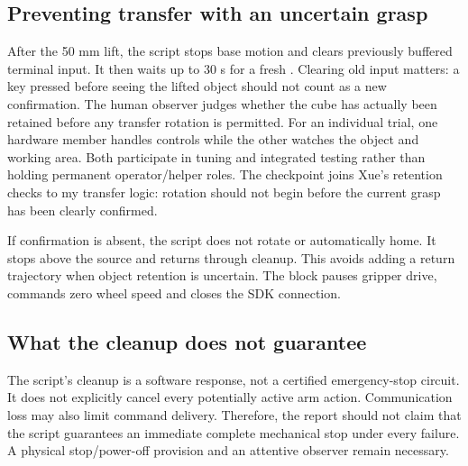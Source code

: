 \subsection{Preventing transfer with an uncertain grasp}
After the 50 mm lift, the script stops base motion and clears previously buffered terminal input. It then waits up to 30 s for a fresh . Clearing old input matters: a key pressed before seeing the lifted object should not count as a new confirmation. The human observer judges whether the cube has actually been retained before any transfer rotation is permitted.
For an individual trial, one hardware member handles controls while the other watches the object and working area. Both participate in tuning and integrated testing rather than holding permanent operator/helper roles. The checkpoint joins Xue's retention checks to my transfer logic: rotation should not begin before the current grasp has been clearly confirmed.
\begin{center}
\end{center}
If confirmation is absent, the script does not rotate or automatically home. It stops above the source and returns through cleanup. This avoids adding a return trajectory when object retention is uncertain. The  block pauses gripper drive, commands zero wheel speed and closes the SDK connection.
\subsection{What the cleanup does not guarantee}
The script's cleanup is a software response, not a certified emergency-stop circuit. It does not explicitly cancel every potentially active arm action. Communication loss may also limit command delivery. Therefore, the report should not claim that the script guarantees an immediate complete mechanical stop under every failure. A physical stop/power-off provision and an attentive observer remain necessary.
